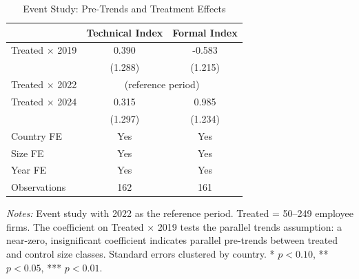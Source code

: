 \begin{table}[H]
\centering
\caption{Event Study: Pre-Trends and Treatment Effects}
\label{tab:event_study}
\begin{threeparttable}
\begin{tabular}{lcc}
\toprule
 & Technical Index & Formal Index \\
\midrule
Treated $\times$ 2019 & 0.390 & -0.583 \\
 & (1.288) & (1.215) \\
Treated $\times$ 2022 & \multicolumn{2}{c}{(reference period)} \\
Treated $\times$ 2024 & 0.315 & 0.985 \\
 & (1.297) & (1.234) \\
\midrule
Country FE & Yes & Yes \\
Size FE & Yes & Yes \\
Year FE & Yes & Yes \\
Observations & 162 & 161 \\
\bottomrule
\end{tabular}
\begin{tablenotes}[flushleft]
\small
\item \textit{Notes:} Event study with 2022 as the reference period. Treated = 50--249 employee firms. The coefficient on Treated $\times$ 2019 tests the parallel trends assumption: a near-zero, insignificant coefficient indicates parallel pre-trends between treated and control size classes. Standard errors clustered by country. * $p<0.10$, ** $p<0.05$, *** $p<0.01$.
\end{tablenotes}
\end{threeparttable}
\end{table}
